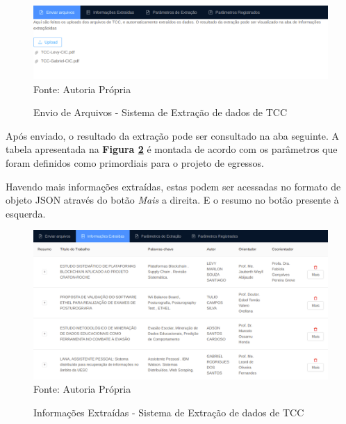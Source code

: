 \begin{figure}[H]
\centering
\captionsetup{justification   = raggedright,
              singlelinecheck = false}
\caption{Envio de Arquivos - Sistema de Extração de dados de TCC}\label{upload}
\includegraphics[width=1\textwidth]{figs/tccExtract/upload.png}
\footnotesize Fonte: Autoria Própria
\end{figure}

Após enviado, o resultado da extração pode ser consultado na aba seguinte. A tabela apresentada na \textbf{Figura \ref{extr}} é montada de acordo com os parâmetros que foram definidos como primordiais para o projeto de egressos.

Havendo mais informações extraídas, estas podem ser acessadas no formato de objeto JSON através do botão \textit{Mais} a direita. E o resumo no botão presente à esquerda.

\begin{figure}[H]
\centering
\captionsetup{justification   = raggedright,
              singlelinecheck = false}
\caption{Informações Extraídas - Sistema de Extração de dados de TCC}\label{extr}
\includegraphics[width=1\textwidth]{figs/tccExtract/extr.png}
\footnotesize Fonte: Autoria Própria
\end{figure}